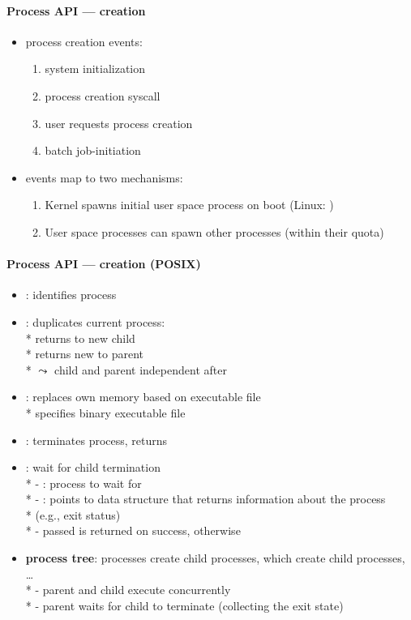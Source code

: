\paragraph{Process API --- creation}
\begin{itemize}
  \item process creation events:
  \begin{enumerate}
    \item system initialization
    \item process creation syscall
    \item user requests process creation
    \item batch job-initiation
  \end{enumerate}
  \item events map to two mechanisms:
  \begin{enumerate}
    \item Kernel spawns initial user space process on boot (Linux: )
    \item User space processes can spawn other processes (within their quota)
  \end{enumerate}
\end{itemize}

\paragraph{Process API --- creation (POSIX)}
\begin{itemize}
  \item {}: identifies process
  \item {}: duplicates current process: \\*
    returns  to new child \\*
    returns new  to parent \\*
    \( \leadsto \) child and parent independent after 
  \item {}: replaces own memory based on executable file \\*
     specifies binary executable file
  \item {}: terminates process, returns 
  \item {}: wait for child termination \\*
    - : process to wait for \\*
    - : points to data structure that returns information about the process \\*  (e.g., exit status) \\*
    - passed  is returned on success,  otherwise
  \item \textbf{process tree}: processes create child processes, which create child processes, \dots \\*
    - parent and child execute concurrently \\*
    - parent waits for child to terminate (collecting the exit state)
\end{itemize}

